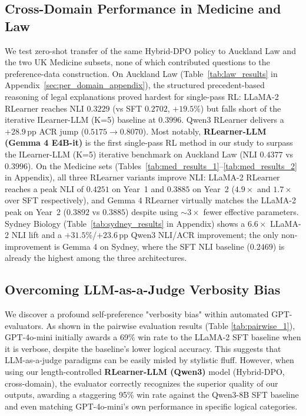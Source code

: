 \subsection{Cross-Domain Performance in Medicine and Law}
We test zero-shot transfer of the same Hybrid-DPO policy to Auckland Law and the two UK Medicine subsets, none of which contributed questions to the preference-data construction. On Auckland Law (Table~\ref{tab:law_results} in Appendix~\ref{sec:per_domain_appendix}), the structured precedent-based reasoning of legal explanations proved hardest for single-pass RL: LLaMA-2 RLearner reaches NLI $0.3229$ (vs SFT $0.2702$, $+19.5\%$) but falls short of the iterative ILearner-LLM (K=5) baseline at $0.3996$. Qwen3 RLearner delivers a $+28.9$\,pp ACR jump ($0.5175 \to 0.8070$). Most notably, \textbf{RLearner-LLM (Gemma 4 E4B-it)} is the first single-pass RL method in our study to surpass the ILearner-LLM (K=5) iterative benchmark on Auckland Law (NLI $0.4377$ vs $0.3996$). On the Medicine sets (Tables~\ref{tab:med_results_1}--\ref{tab:med_results_2} in Appendix), all three RLearner variants improve NLI: LLaMA-2 RLearner reaches a peak NLI of $0.4251$ on Year~1 and $0.3885$ on Year~2 ($4.9\times$ and $1.7\times$ over SFT respectively), and Gemma 4 RLearner virtually matches the LLaMA-2 peak on Year~2 ($0.3892$ vs $0.3885$) despite using $\sim 3\times$ fewer effective parameters. Sydney Biology (Table~\ref{tab:sydney_results} in Appendix) shows a $6.6\times$ LLaMA-2 NLI lift and a $+31.5\%$/$+23.6$\,pp Qwen3 NLI/ACR improvement; the only non-improvement is Gemma 4 on Sydney, where the SFT NLI baseline ($0.2469$) is already the highest among the three architectures.

\subsection{Overcoming LLM-as-a-Judge Verbosity Bias}
We discover a profound self-preference "verbosity bias" within automated GPT-evaluators. As shown in the pairwise evaluation results (Table \ref{tab:pairwise_1}), GPT-4o-mini initially awards a 69\% win rate to the LLaMA-2 SFT baseline when it is verbose, despite the baseline's lower logical accuracy. This suggests that LLM-as-a-judge paradigms can be easily misled by stylistic fluff. However, when using our length-controlled \textbf{RLearner-LLM (Qwen3)} model (Hybrid-DPO, cross-domain), the evaluator correctly recognizes the superior quality of our outputs, awarding a staggering 95\% win rate against the Qwen3-8B SFT baseline and even matching GPT-4o-mini's own performance in specific logical categories.

